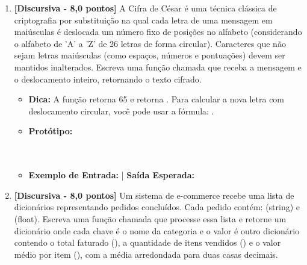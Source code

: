 \begin{enumerate}[label=\textbf{Q\arabic*.}, start=1]
\item \textbf{[Discursiva - 8,0 pontos]} A Cifra de César é uma técnica clássica de criptografia por substituição na qual cada letra de uma mensagem em maiúsculas é deslocada um número fixo de posições no alfabeto (considerando o alfabeto de 'A' a 'Z' de 26 letras de forma circular). Caracteres que não sejam letras maiúsculas (como espaços, números e pontuações) devem ser mantidos inalterados. Escreva uma função chamada  que receba a mensagem e o deslocamento inteiro, retornando o texto cifrado.

\begin{itemize}[leftmargin=*]
    \item \textbf{Dica:} A função  retorna 65 e  retorna . Para calcular a nova letra com deslocamento circular, você pode usar a fórmula: .
    \item \textbf{Protótipo:}\newline {}\\\\\\
    \item \textbf{Exemplo de Entrada:}  \quad | \quad \textbf{Saída Esperada:} 
\end{itemize}



\vspace{0.5cm}

\item \textbf{[Discursiva - 8,0 pontos]} Um sistema de e-commerce recebe uma lista de dicionários representando pedidos concluídos. Cada pedido contém:  (string) e  (float). Escreva uma função chamada  que processe essa lista e retorne um dicionário onde cada chave é o nome da categoria e o valor é outro dicionário contendo o total faturado (), a quantidade de itens vendidos () e o valor médio por item (), com a média arredondada para duas casas decimais.


\end{enumerate}
